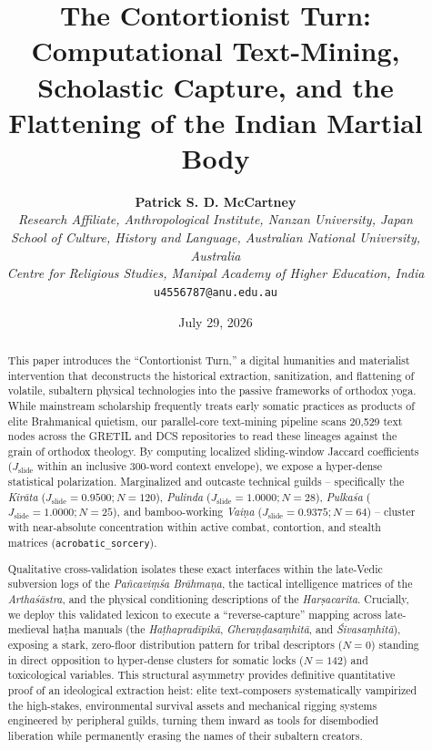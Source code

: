 \documentclass[11pt,twoside,letterpaper]{article}
\title{\textbf{The Contortionist Turn:\\Computational Text-Mining, Scholastic Capture, and the Flattening of the Indian Martial Body}}
\author{\textbf{Patrick S. D. McCartney}\\
\textit{Research Affiliate, Anthropological Institute, Nanzan University, Japan}\\
\textit{School of Culture, History and Language, Australian National University, Australia}\\
\textit{Centre for Religious Studies, Manipal Academy of Higher Education, India}\\
\texttt{u4556787@anu.edu.au}}
\date{July 29, 2026}
\begin{document}
\maketitle
\begin{abstract}
This paper introduces the ``Contortionist Turn,'' a digital humanities and materialist intervention that deconstructs the historical extraction, sanitization, and flattening of volatile, subaltern physical technologies into the passive frameworks of orthodox yoga. While mainstream scholarship frequently treats early somatic practices as products of elite Brahmanical quietism, our parallel-core text-mining pipeline scans 20,529 text nodes across the GRETIL and DCS repositories to read these lineages against the grain of orthodox theology. By computing localized sliding-window Jaccard coefficients ($J_{\text{slide}}$ within an inclusive 300-word context envelope), we expose a hyper-dense statistical polarization. Marginalized and outcaste technical guilds -- specifically the \textit{Kirāta} ($J_{\text{slide}} = 0.9500; N=120$), \textit{Pulinda} ($J_{\text{slide}} = 1.0000; N=28$), \textit{Pulkaśa} ($J_{\text{slide}} = 1.0000; N=25$), and bamboo-working \textit{Vaiṇa} ($J_{\text{slide}} = 0.9375; N=64$) -- cluster with near-absolute concentration within active combat, contortion, and stealth matrices (\texttt{acrobatic\_sorcery}). 

Qualitative cross-validation isolates these exact interfaces within the late-Vedic subversion logs of the \textit{Pañcaviṃśa Brāhmaṇa}, the tactical intelligence matrices of the \textit{Arthaśāstra}, and the physical conditioning descriptions of the \textit{Harṣacarita}. Crucially, we deploy this validated lexicon to execute a ``reverse-capture'' mapping across late-medieval haṭha manuals (the \textit{Haṭhapradīpikā}, \textit{Gheraṇḍasaṃhitā}, and \textit{Śivasaṃhitā}), exposing a stark, zero-floor distribution pattern for tribal descriptors ($N=0$) standing in direct opposition to hyper-dense clusters for somatic locks ($N=142$) and toxicological variables. This structural asymmetry provides definitive quantitative proof of an ideological extraction heist: elite text-composers systematically vampirized the high-stakes, environmental survival assets and mechanical rigging systems engineered by peripheral guilds, turning them inward as tools for disembodied liberation while permanently erasing the names of their subaltern creators.
\end{abstract}
\end{document}
